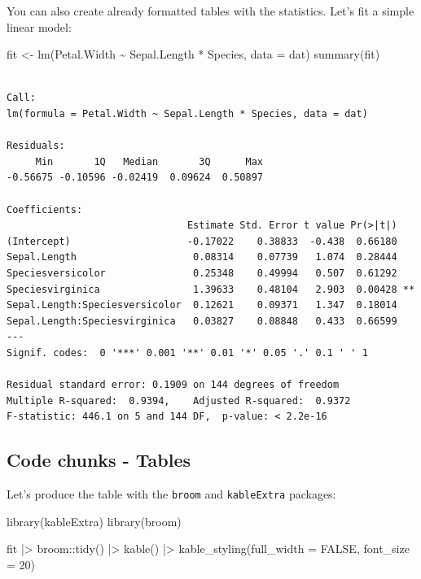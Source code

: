 \documentclass[
  letterpaper,
  DIV=11,
  numbers=noendperiod]{scrartcl}
\newenvironment{Shaded}{\begin{snugshade}}{\end{snugshade}}
\newcommand{\AttributeTok}[1]{\textcolor[rgb]{0.40,0.45,0.13}{#1}}
\newcommand{\ConstantTok}[1]{\textcolor[rgb]{0.56,0.35,0.01}{#1}}
\newcommand{\DecValTok}[1]{\textcolor[rgb]{0.68,0.00,0.00}{#1}}
\newcommand{\FunctionTok}[1]{\textcolor[rgb]{0.28,0.35,0.67}{#1}}
\newcommand{\NormalTok}[1]{\textcolor[rgb]{0.00,0.23,0.31}{#1}}
\newcommand{\OtherTok}[1]{\textcolor[rgb]{0.00,0.23,0.31}{#1}}
\newcommand{\SpecialCharTok}[1]{\textcolor[rgb]{0.37,0.37,0.37}{#1}}
\begin{document}
You can also create already formatted tables with the statistics. Let's
fit a simple linear model:

\begin{Shaded}
\begin{Highlighting}[]
\NormalTok{fit }\OtherTok{\textless{}{-}} \FunctionTok{lm}\NormalTok{(Petal.Width }\SpecialCharTok{\textasciitilde{}}\NormalTok{ Sepal.Length }\SpecialCharTok{*}\NormalTok{ Species, }\AttributeTok{data =}\NormalTok{ dat)}
\FunctionTok{summary}\NormalTok{(fit)}
\end{Highlighting}
\end{Shaded}

\begin{verbatim}

Call:
lm(formula = Petal.Width ~ Sepal.Length * Species, data = dat)

Residuals:
     Min       1Q   Median       3Q      Max 
-0.56675 -0.10596 -0.02419  0.09624  0.50897 

Coefficients:
                               Estimate Std. Error t value Pr(>|t|)   
(Intercept)                    -0.17022    0.38833  -0.438  0.66180   
Sepal.Length                    0.08314    0.07739   1.074  0.28444   
Speciesversicolor               0.25348    0.49994   0.507  0.61292   
Speciesvirginica                1.39633    0.48104   2.903  0.00428 **
Sepal.Length:Speciesversicolor  0.12621    0.09371   1.347  0.18014   
Sepal.Length:Speciesvirginica   0.03827    0.08848   0.433  0.66599   
---
Signif. codes:  0 '***' 0.001 '**' 0.01 '*' 0.05 '.' 0.1 ' ' 1

Residual standard error: 0.1909 on 144 degrees of freedom
Multiple R-squared:  0.9394,    Adjusted R-squared:  0.9372 
F-statistic: 446.1 on 5 and 144 DF,  p-value: < 2.2e-16
\end{verbatim}

\hypertarget{code-chunks---tables-1}{%
\subsection{Code chunks - Tables}\label{code-chunks---tables-1}}

Let's produce the table with the \texttt{broom} and \texttt{kableExtra}
packages:

\begin{Shaded}
\begin{Highlighting}[]
\FunctionTok{library}\NormalTok{(kableExtra)}
\FunctionTok{library}\NormalTok{(broom)}

\NormalTok{fit }\SpecialCharTok{|\textgreater{}} 
\NormalTok{    broom}\SpecialCharTok{::}\FunctionTok{tidy}\NormalTok{() }\SpecialCharTok{|\textgreater{}} 
    \FunctionTok{kable}\NormalTok{() }\SpecialCharTok{|\textgreater{}} 
    \FunctionTok{kable\_styling}\NormalTok{(}\AttributeTok{full\_width =} \ConstantTok{FALSE}\NormalTok{,}
                  \AttributeTok{font\_size =} \DecValTok{20}\NormalTok{)}
\end{Highlighting}
\end{Shaded}
\end{document}
